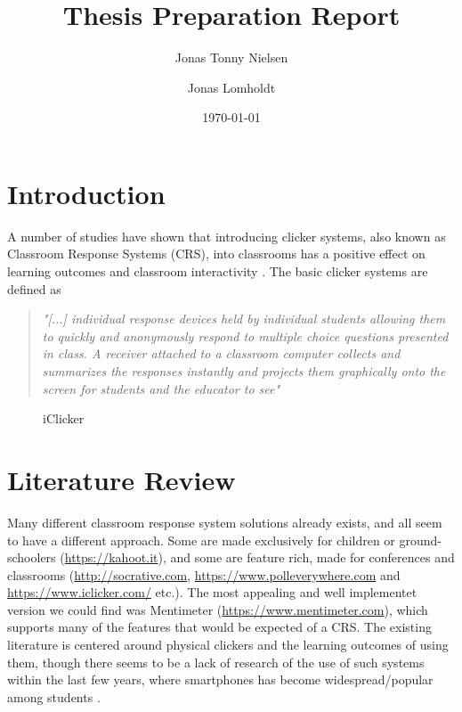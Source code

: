 \documentclass{article}
\title{Thesis Preparation Report}
\author{Jonas Tonny Nielsen \and Jonas Lomholdt}
\date{\today}
\begin{document}
\maketitle

\listoftodos

\tableofcontents
\listoffigures


\section{Introduction} %
A number of studies have shown that introducing clicker systems, also known as Classroom Response Systems (CRS),  into classrooms has a positive effect on learning outcomes and classroom interactivity \cite{yourstone2008classroom, siau2006use, lantz2014effectiveness}. The basic clicker systems are defined as 

\begin{quote}
    \emph{"[...] individual response devices held by individual students allowing them to quickly and anonymously respond to multiple choice questions presented in class. A receiver attached to a classroom computer collects and summarizes the responses instantly and projects them graphically onto the screen for students and the educator to see"} \cite{lantz2014effectiveness}
\end{quote}



\begin{figure}[H]
\capstart
	\centering
	\caption{iClicker\label{fig:iclicker}}
\end{figure}






\section{Literature Review} %
Many different classroom response system solutions already exists, and all seem to have a different approach. Some are made exclusively for children or ground-schoolers (\url{https://kahoot.it}), and some are feature rich, made for conferences and classrooms (\url{http://socrative.com}, \url{https://www.polleverywhere.com} and \url{https://www.iclicker.com/} etc.). The most appealing and well implementet version we could find was Mentimeter (\url{https://www.mentimeter.com}), which supports many of the features that would be expected of a CRS. The existing literature is centered around physical clickers and the learning outcomes of using them, though there seems to be a lack of research of the use of such systems within the last few years, where smartphones has become widespread/popular among students \cite[p.~329]{stowell2015use}. 
\end{document}
